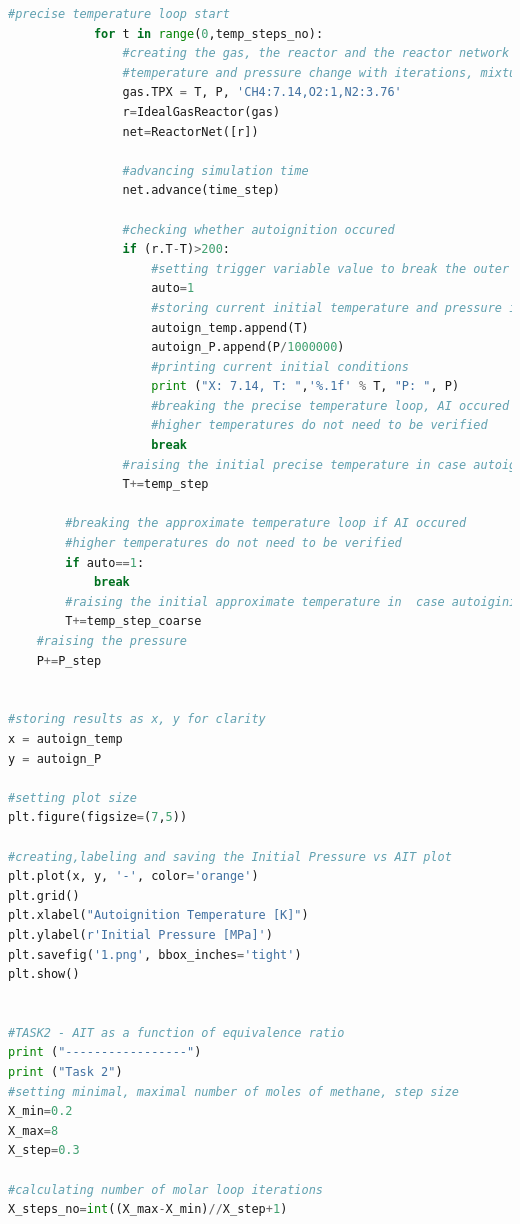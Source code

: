 \documentclass[a4paper]{article}[11pt]
\begin{document}
\begin{lstlisting}[language=Python]
            #precise temperature loop start 
            for t in range(0,temp_steps_no):
                #creating the gas, the reactor and the reactor network for precise calculations
                #temperature and pressure change with iterations, mixture composition is constant
                gas.TPX = T, P, 'CH4:7.14,O2:1,N2:3.76'
                r=IdealGasReactor(gas)
                net=ReactorNet([r])
                
                #advancing simulation time 
                net.advance(time_step)
                
                #checking whether autoignition occured 
                if (r.T-T)>200:
                    #setting trigger variable value to break the outer loop 
                    auto=1
                    #storing current initial temperature and pressure in arrays
                    autoign_temp.append(T)
                    autoign_P.append(P/1000000)
                    #printing current initial conditions
                    print ("X: 7.14, T: ",'%.1f' % T, "P: ", P)
                    #breaking the precise temperature loop, AI occured
                    #higher temperatures do not need to be verified
                    break
                #raising the initial precise temperature in case autoiginition didn't occur    
                T+=temp_step 
                
        #breaking the approximate temperature loop if AI occured
        #higher temperatures do not need to be verified
        if auto==1:
            break    
        #raising the initial approximate temperature in  case autoiginition didn't occur    
        T+=temp_step_coarse
    #raising the pressure   
    P+=P_step


#storing results as x, y for clarity
x = autoign_temp
y = autoign_P
 
#setting plot size
plt.figure(figsize=(7,5))

#creating,labeling and saving the Initial Pressure vs AIT plot
plt.plot(x, y, '-', color='orange') 
plt.grid()
plt.xlabel("Autoignition Temperature [K]")
plt.ylabel(r'Initial Pressure [MPa]')
plt.savefig('1.png', bbox_inches='tight')
plt.show()


#TASK2 - AIT as a function of equivalence ratio
print ("-----------------")
print ("Task 2")
#setting minimal, maximal number of moles of methane, step size
X_min=0.2
X_max=8
X_step=0.3

#calculating number of molar loop iterations
X_steps_no=int((X_max-X_min)//X_step+1)



\end{lstlisting}
\end{document}
